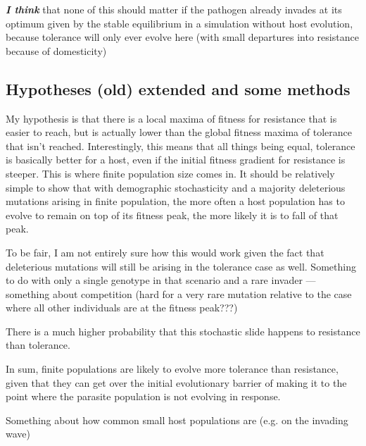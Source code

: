 \documentclass{article}
\begin{document}
\textbf{\emph{I think}} that none of this should matter if the pathogen already invades at its optimum given by the stable equilibrium in a simulation without host evolution, because tolerance will only ever evolve here (with small departures into resistance because of domesticity)

\subsection*{Hypotheses (old) extended and some methods}

My hypothesis is that there is a local maxima of fitness for resistance that is easier to reach, but is actually lower than the global fitness maxima of tolerance that isn't reached. Interestingly, this means that all things being equal, tolerance is basically better for a host, even if the initial fitness gradient for resistance is steeper. This is where finite population size comes in. It should be relatively simple to show that with demographic stochasticity and a majority deleterious mutations arising in finite population, the more often a host population has to evolve to remain on top of its fitness peak, the more likely it is to fall of that peak. 

To be fair, I am not entirely sure how this would work given the fact that deleterious mutations will still be arising in the tolerance case as well. Something to do with only a single genotype in that scenario and a rare invader --- something about competition (hard for a very rare mutation relative to the case where all other individuals are at the fitness peak???)

There is a much higher probability that this stochastic slide happens to resistance than tolerance. 

In sum, finite populations are likely to evolve more tolerance than resistance, given that they can get over the initial evolutionary barrier of making it to the point where the parasite population is not evolving in response. 

Something about how common small host populations are (e.g. on the invading wave)
\end{document}
